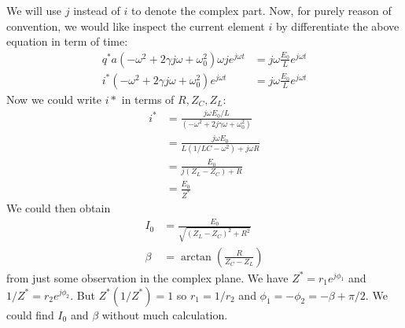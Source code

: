 We will use $j$ instead of $i$ to denote the complex part. Now, for purely reason of convention, we would like inspect the current element $i$ by differentiate the above equation in term of time:
\begin{align*}
    q^{*} a\left(-\omega^{2}+2 \gamma j \omega+\omega_{0}^{2}\right) \omega j e^{j \omega t}&=j\omega \frac{E_0}{L} e^{j\omega t}\\ 
   i^{*}\left(-\omega^{2}+2 \gamma j \omega+\omega_{0}^{2}\right) e^{j \omega t}&=j\omega \frac{E_0}{L} e^{j\omega t} 
\end{align*}
Now we could write $i*$ in terms of $R, Z_C, Z_L$:
\begin{align*}
   i^{*} &=\frac{j \omega E_0/L}{\left(-\omega^{2}+2 j\gamma  \omega+\omega_{0}^{2}\right)} \\
   &= \frac{j\omega  E_0}{L(1/LC -\omega ^2) + j\omega R} \\
   &= \frac{E_0}{j(Z_L -Z_C) + R} \\
   &= \frac{E_0}{Z^*}
\end{align*}
We could then obtain
\begin{align*}
    I_0 &= \frac{E_0}{\sqrt{(Z_L  - Z_C)^2 + R^2}} \\
    \beta &= \arctan(\frac{R}{Z_C - Z_L}) 
\end{align*}
from just some observation in the complex plane. \newline
We have $Z^*=r_1e^{j\phi_1}$ and $1/Z^*=r_2e^{j\phi_2}$. But $Z^*(1/Z^*) = 1$ so $r_1 = 1/r_2$ and $\phi_1 = -\phi_2 = -\beta + \pi/ 2 $. We could find $I_0$ and $\beta$ without much calculation. 
\begin{center}
\end{center}

